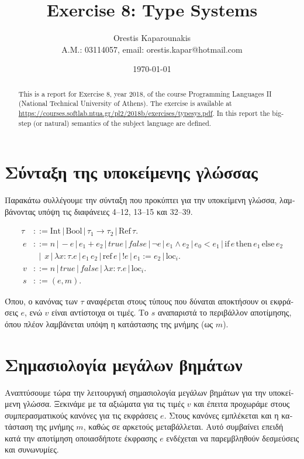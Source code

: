 \documentclass[12pt]{article}
\title{Exercise 8: Type Systems}
\author{Orestis Kaparounakis\\
\small\textgreek{Α.Μ.}: 03114057, email: orestis.kapar@hotmail.com}
\date{\today}
\begin{document}
\maketitle
\begin{abstract}
    This is a report for Exercise 8, year 2018, of the course Programming
    Languages II (National Technical University of Athens).
    The exercise is available at \url{https://courses.softlab.ntua.gr/pl2/2018b/exercises/typesys.pdf}.
    In this report the big-step (or natural) semantics of the subject language
    are defined.
\end{abstract}

\setcounter{section}{-1}
\section{\textgreek{Σύνταξη της υποκείμενης γλώσσας}}
\textgreek{Παρακάτω συλλέγουμε την σύνταξη που προκύπτει για 
την υποκείμενη γλώσσα, λαμβάνοντας υπόψη τις διαφάνειες
4--12, 13--15 και 32--39.}

\vspace{-1em}
\begin{align*}
  \tau &::= \textrm{Int} \,|\, \textrm{Bool} \,|\, \tau_1 \rightarrow \tau_2 
  \,|\, \textrm{Ref}\, \tau.\\
\
  e &::= n  \,|\, -e  \,|\, e_1 + e_2
  \,|\, true  \,|\, false \,|\, \neg e \,|\, e_1 \wedge e_2 \,|\, e_0 < e_1
  \,|\,  \textrm{if}\, e\, \textrm{then}\, e_1\, \textrm{else}\, e_2\\
  &~~~|~~ x \,|\, \lambda x : \tau . e \,|\, e_1\,e_2
  \,|\, \textrm{ref}\, e \,|\, !e \,|\, e_1 := e_2 \,|\, \textrm{loc}_i.\\
\
  v &::= n \,|\, true \,|\, false \,|\, \lambda x : \tau . e 
    \,|\, \textrm{loc}_i.\\
\
  s &::= (e, m).
\end{align*}

\textgreek{Όπου, ο κανόνας των $\tau$ αναφέρεται στους τύπους που δύναται
αποκτήσουν οι εκφράσεις $e$, ενώ $v$ είναι αντίστοιχα οι τιμές. 
Το $s$ αναπαριστά το περιβάλλον αποτίμησης, όπου πλέον 
λαμβάνεται υπόψη η κατάστασης της μνήμης (ως $m$).}

\section{\textgreek{Σημασιολογία μεγάλων βημάτων}}
\label{sec:big-step-sos}
\textgreek{Αναπτύσουμε τώρα την λειτουργική σημασιολογία μεγάλων βημάτων
για την υποκείμενη γλώσσα. Ξεκινάμε με τα αξιώματα για τις τιμές $v$ και 
έπειτα προχωράμε στους συμπερασματικούς κανόνες για τις εκφράσεις $e$.
Στους κανόνες εμπλέκεται και η κατάσταση της μνήμης $m$, καθώς σε αρκετούς
μεταβάλλεται. Αυτό συμβαίνει επειδή κατά την αποτίμηση οποιασδήποτε
έκφρασης $e$ ενδέχεται να παρεμβληθούν δεσμεύσεις και συνωνυμίες.}
\end{document}
